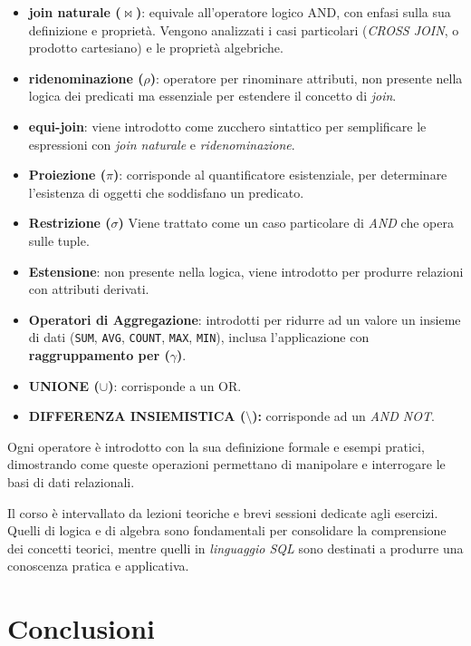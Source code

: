 \documentclass[withtimes]{easychair}
\begin{document}
\begin{itemize}
  \item \textbf{join naturale (\(\bowtie\))}: equivale all'operatore logico AND, con enfasi sulla sua definizione e proprietà. Vengono analizzati i casi particolari (\emph{CROSS JOIN}, o prodotto cartesiano) e le proprietà algebriche.
  \item \textbf{ridenominazione (\(\rho\))}: operatore per rinominare attributi, non presente nella logica dei predicati ma essenziale per estendere il concetto di \emph{join}.
  \item \textbf{equi-join}: viene introdotto come zucchero sintattico per semplificare le espressioni con \emph{join naturale} e \emph{ridenominazione}.
  \item \textbf{Proiezione (\(\pi\))}: corrisponde al quantificatore esistenziale, per determinare l'esistenza di oggetti che soddisfano un predicato.
  \item \textbf{Restrizione (\(\sigma\))} Viene trattato come un caso particolare di \emph{AND} che opera sulle tuple.
  \item \textbf{Estensione}: non presente nella logica, viene introdotto per produrre relazioni con attributi derivati.
  \item \textbf{Operatori di Aggregazione}: introdotti per ridurre ad un valore un insieme di dati (\texttt{SUM}, \texttt{AVG}, \texttt{COUNT}, \texttt{MAX}, \texttt{MIN}), inclusa l'applicazione con \textbf{raggruppamento per (\(\gamma\))}.
  \item \textbf{UNIONE (\(\cup\))}: corrisponde a un OR.
  \item \textbf{DIFFERENZA INSIEMISTICA (\(\setminus\)):} corrisponde ad un \emph{AND NOT}.
\end{itemize}

Ogni operatore è introdotto con la sua definizione formale e esempi pratici, dimostrando come queste operazioni permettano di manipolare e interrogare le basi di dati relazionali.

Il corso è intervallato da lezioni teoriche e brevi sessioni dedicate agli esercizi. Quelli di logica e di algebra sono fondamentali per consolidare la comprensione dei concetti teorici, mentre quelli in \emph{linguaggio SQL} sono destinati a produrre una conoscenza pratica e applicativa.

\section{Conclusioni}\label{conclusioni}
\end{document}
